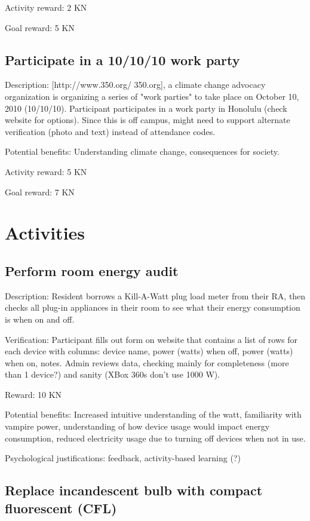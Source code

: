 Activity reward: 2 KN

Goal reward: 5 KN

\subsection{Participate in a 10/10/10 work party}

Description: [http://www.350.org/ 350.org], a climate change advocacy organization is organizing a series of "work parties" to take place on October 10, 2010 (10/10/10). Participant participates in a work party in Honolulu (check website for options). Since this is off campus, might need to support alternate verification (photo and text) instead of attendance codes.

Potential benefits: Understanding climate change, consequences for society.

Activity reward: 5 KN

Goal reward: 7 KN


\section{Activities}

\subsection{Perform room energy audit}

Description: Resident borrows a Kill-A-Watt plug load meter from their RA, then checks all plug-in appliances in their room to see what their energy consumption is when on and off.

Verification: Participant fills out form on website that contains a list of rows for each device with columns: device name, power (watts) when off, power (watts) when on, notes. Admin reviews data, checking mainly for completeness (more than 1 device?) and sanity (XBox 360s don't use 1000 W).

Reward: 10 KN

Potential benefits: Increased intuitive understanding of the watt, familiarity with vampire power, understanding of how device usage would impact energy consumption, reduced electricity usage due to turning off devices when not in use.

Psychological justifications: feedback, activity-based learning (?)

\subsection{Replace incandescent bulb with compact fluorescent (CFL)}

